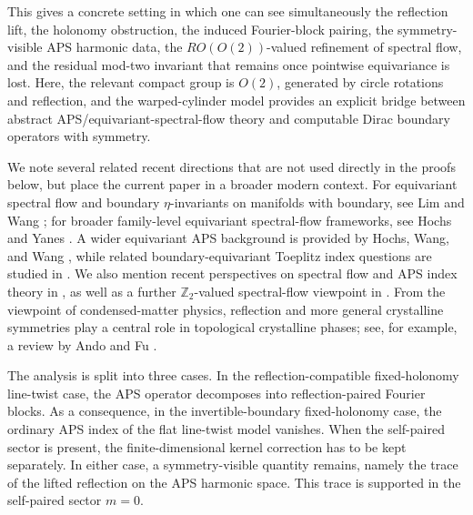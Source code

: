 \documentclass[11pt]{article}
\theoremstyle{definition}
\numberwithin{equation}{section}
\begin{document}
This gives a concrete setting in which one can see simultaneously the reflection lift, the holonomy obstruction, the induced Fourier-block pairing, the symmetry-visible APS harmonic data, the \(RO(O(2))\)-valued refinement of spectral flow, and the residual mod-two invariant that remains once pointwise equivariance is lost. Here, the relevant compact group is \(O(2)\), generated by circle rotations and reflection, and the warped-cylinder model provides an explicit bridge between abstract APS/equivariant-spectral-flow theory and computable Dirac boundary operators with symmetry.

We note several related recent directions that are not used directly in the proofs below, but place the current paper in a broader modern context. For equivariant spectral flow and boundary $\eta$-invariants on manifolds with boundary, see Lim and Wang \cite{LimWang2021EquivariantSpectralFlowEtaBoundary}; for broader family-level equivariant spectral-flow frameworks, see Hochs and Yanes \cite{HochsYanes2024EquivariantSpectralFlowDiracType}. A wider equivariant APS background is provided by Hochs, Wang, and Wang \cite{HochsWangWang2019EquivariantAPSI,HochsWangWang2020EquivariantAPSII}, while related boundary-equivariant Toeplitz index questions are studied in \cite{LimWang2021EquivariantToeplitzBoundary}. We also mention recent perspectives on spectral flow and APS index theory in \cite{vanDenDungen2024DiracSchrodingerIndexSpectralFlow,BaerZiemke2025SpectralFlowAPSIndex}, as well as a further $\mathbb Z_2$-valued spectral-flow viewpoint in \cite{BravermanHajSaeediSadegh2024Z2ToeplitzSpectralFlow}. From the viewpoint of condensed-matter physics, reflection and more general crystalline symmetries play a central role in topological crystalline phases; see, for example, a review by Ando and Fu \cite{Ando_Fu_2015}.

The analysis is split into three cases. In the reflection-compatible fixed-holonomy line-twist case, the APS operator decomposes into reflection-paired Fourier blocks. As a consequence, in the invertible-boundary fixed-holonomy case, the ordinary APS index of the flat line-twist model vanishes. When the self-paired sector is present, the finite-dimensional kernel correction has to be kept separately. In either case, a symmetry-visible quantity remains, namely the trace of the lifted reflection on the APS harmonic space. This trace is supported in the self-paired sector \(m=0\).
\end{document}
